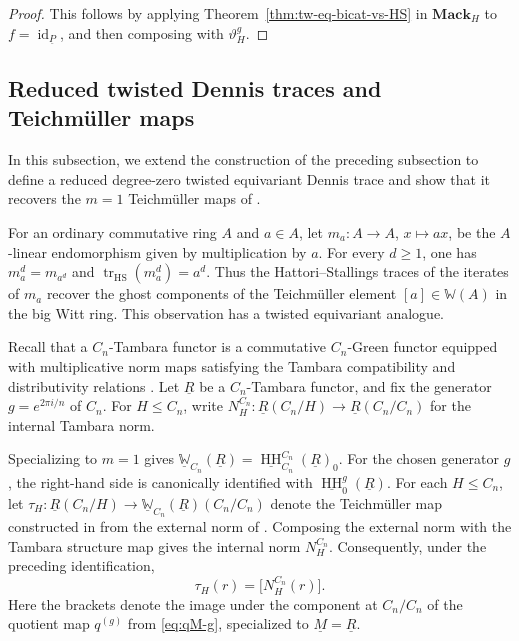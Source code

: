 \documentclass[11pt,oneside]{amsart}
\DeclareMathOperator{\HH}{HH}
\DeclareMathOperator{\id}{id}
\numberwithin{equation}{section}
\numberwithin{figure}{section}
\theoremstyle{plain}
\theoremstyle{definition}
\theoremstyle{remark}
\begin{document}
\begin{proof}
This follows by applying
Theorem~\ref{thm:tw-eq-bicat-vs-HS} in
\(\mathbf{Mack}_H\) to \(f=\id_{\underline P}\), and then composing
with \(\vartheta_H^g\).
\end{proof}

\subsection{Reduced twisted Dennis traces and Teichm\"uller maps}
In this subsection, we extend the construction of the preceding
subsection to define a reduced degree-zero twisted equivariant Dennis
trace and show that it recovers the \(m=1\)
Teichm\"uller maps of \cite[Theorem~6.13]{BGHL}.

For an ordinary commutative ring \(A\) and \(a\in A\), let
\(m_a\colon A\to A\), \(x\mapsto ax\), be the \(A\)-linear
endomorphism given by multiplication by \(a\). For every \(d\geq 1\),
one has
\(m_a^d=m_{a^d}\) and
\(\operatorname{tr}_{\mathrm{HS}}(m_a^d)=a^d\).
Thus the Hattori--Stallings traces of the iterates of \(m_a\) recover
the ghost components of the Teichm\"uller element
\([a]\in{\mathbb W}(A)\) in the big Witt ring.
This observation has a twisted equivariant analogue.

Recall that a \(C_n\)-Tambara functor is a commutative
\(C_n\)-Green functor equipped with multiplicative norm maps satisfying
the Tambara compatibility and distributivity relations
\cite{Tambara}. Let \(\underline R\) be a \(C_n\)-Tambara functor,
and fix the generator \(g=e^{2\pi i/n}\) of \(C_n\). For
\(H\leq C_n\), write
\(N_H^{C_n}\colon\underline R(C_n/H)\to
\underline R(C_n/C_n)\)
for the internal Tambara norm.

Specializing \cite[Definition~6.2]{BGHL} to \(m=1\) gives
\(
\underline{\mathbb W}_{C_n}(\underline R)
=
\underline{\HH}^{C_n}_{C_n}(\underline R)_0.
\)
For the chosen generator \(g\), the right-hand side is canonically
identified with \(\underline{\HH}_0^g(\underline R)\).
For each \(H\leq C_n\), let
\(
\tau_H\colon
\underline R(C_n/H)
\longrightarrow
\underline{\mathbb W}_{C_n}(\underline R)(C_n/C_n)
\)
denote the Teichm\"uller map constructed in
\cite[Theorem~6.13]{BGHL} from the external norm of
\cite[Proposition~6.12]{BGHL}. Composing the external norm with the
Tambara structure map gives the internal norm \(N_H^{C_n}\).
Consequently, under the preceding identification,
\begin{equation}\label{eq:BGHL-Teichmuller}
\tau_H(r)
=
\bigl[N_H^{C_n}(r)\bigr].
\end{equation}
Here the brackets denote the image under the component at
\(C_n/C_n\) of the quotient map \(q^{(g)}\) from
\eqref{eq:qM-g}, specialized to \(\underline M=\underline R\).
\end{document}
